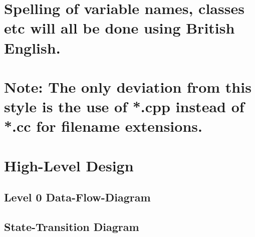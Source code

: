\documentclass[a4paper,11pt,twoside,pdftex,draft]{article}
\begin{document}
\hypertarget{section-3}{%
\section{}\label{section-3}}

\hypertarget{spelling-of-variable-names-classes-etc-will-all-be-done-using-british-english.}{%
\section{\texorpdfstring{Spelling of variable names, classes etc will
all be done using British English.
}{Spelling of variable names, classes etc will all be done using British English. }}\label{spelling-of-variable-names-classes-etc-will-all-be-done-using-british-english.}}

\hypertarget{section-4}{%
\section{}\label{section-4}}

\hypertarget{note-the-only-deviation-from-this-style-is-the-use-of-.cpp-instead-of-.cc-for-filename-extensions.}{%
\section{Note: The only deviation from this style is the use of *.cpp
instead of *.cc for filename
extensions.}\label{note-the-only-deviation-from-this-style-is-the-use-of-.cpp-instead-of-.cc-for-filename-extensions.}}

\hypertarget{high-level-design}{%
\section[High-Level
Design]{\texorpdfstring{\protect\hypertarget{anchor-14}{}{}High-Level
Design}{High-Level Design}}\label{high-level-design}}

\hypertarget{level-0-data-flow-diagram}{%
\subsection[Level 0
Data-Flow-Diagram]{\texorpdfstring{\protect\hypertarget{anchor-15}{}{}Level
0
Data-Flow-Diagram}{Level 0 Data-Flow-Diagram}}\label{level-0-data-flow-diagram}}


\hypertarget{state-transition-diagram}{%
\subsection[State-Transition
Diagram]{\texorpdfstring{\protect\hypertarget{anchor-16}{}{}State-Transition
Diagram}{State-Transition Diagram}}\label{state-transition-diagram}}
\end{document}
